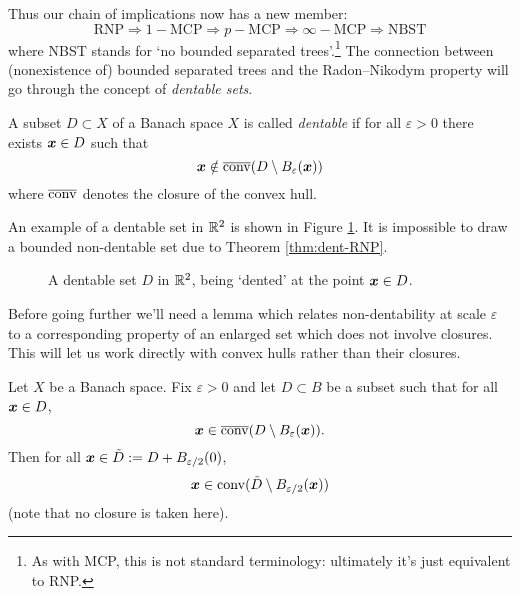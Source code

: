 Thus our chain of implications now has a new member:
\begin{equation*}
  \mathrm{RNP} \Longrightarrow 1-\mathrm{MCP} \Longrightarrow p-\mathrm{MCP} \Longrightarrow \infty-\mathrm{MCP}
  \Longrightarrow \mathrm{NBST}
\end{equation*}
where NBST stands for `no bounded separated trees'.\footnote{As with MCP, this is not standard terminology: ultimately it's just equivalent to RNP.}
The connection between (nonexistence of) bounded separated trees and the Radon--Nikodym property will go through the concept of \emph{dentable sets}.

\begin{defn}
  A subset $D \subset X$ of a Banach space $X$ is called \emph{dentable} if for all $\varepsilon > 0$ there exists $\bm{x} \in D$ such that
  \begin{equation*}
    \bm{x} \notin \overline{\mathrm{conv}}(D \setminus B_{\varepsilon}(\bm{x}))
  \end{equation*}
  where $\overline{\mathrm{conv}}$ denotes the closure of the convex hull.
\end{defn}

An example of a dentable set in $\mathbb{R}^{2}$ is shown in Figure \ref{fig:dentable}.
It is impossible to draw a bounded non-dentable set due to Theorem \ref{thm:dent-RNP}. 

\begin{figure}
    \centering
    \def\svgwidth{\columnwidth}
    
    
    \caption{A dentable set $D$ in $\mathbb{R}^{2}$, being `dented' at the point $\bm{x} \in D$.}
    \label{fig:dentable}
\end{figure}

Before going further we'll need a lemma which relates non-dentability at scale $\varepsilon$ to a corresponding property of an enlarged set which does not involve closures.
This will let us work directly with convex hulls rather than their closures.

\begin{lem}\label{lem:dentlem}
  Let $X$ be a Banach space.
  Fix $\varepsilon > 0$ and let $D \subset B$ be a subset such that for all $\bm{x} \in D$,
  \begin{equation}\label{eq:dentlem-ass}
    \bm{x} \in \overline{\mathrm{conv}}(D \setminus B_{\varepsilon}(\bm{x})).
  \end{equation}
  Then for all $\bm{x} \in \tilde{D} := D + B_{\varepsilon/2}(0)$,
  \begin{equation}
    \bm{x} \in \mathrm{conv}(\tilde{D} \setminus B_{\varepsilon/2}(\bm{x}))
  \end{equation}
  (note that no closure is taken here).
\end{lem}

